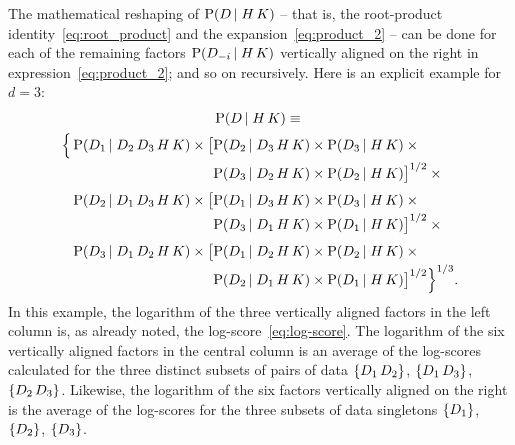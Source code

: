 \documentclass[\ifafour a4paper,12pt,\else a5paper,10pt,\fi%
onecolumn,oneside,article,%
british%
]{memoir}
\theoremstyle{remark}
\theoremstyle{innote}
\DeclarePairedDelimiter\set{\{}{\}}
\newcommand*{\p}{\mathrm{P}}%
\renewcommand*{\|}[1][]{\nonscript\,#1\vert\nonscript\;\mathopen{}}
\newcommand*{\yK}{K}
\begin{document}
The mathematical reshaping of $\p(D \| H \, \yK)$ -- that is, the
root-product identity~\eqref{eq:root_product} and the
expansion~\eqref{eq:product_2} -- can be done for each of the remaining
factors $\p(D_{-i} \| H \, \yK)$ vertically aligned on the right in
expression~\eqref{eq:product_2}; and so on recursively. Here is an explicit
example for $d=3$:
\begin{multline}
  \label{eq:example_further_expansion}
  \p(D \| H \, \yK) \equiv{}\\
  \begin{alignedat}{2}
    \Bigl\{\,&\p(D_{1} \| D_{2} \,D_{3} \, H \, \yK) \times
    \bigl[ &&\p(D_{2} \| D_{3} \, H \, \yK) \times \p( D_{3} \| H \, \yK) \times{}\\[-0.5\jot]
    &&&\p(D_{3} \| D_{2} \, H \, \yK) \times \p( D_{2} \| H \, \yK)
    \bigr]^{1/2}\times{}\\[\jot]
    &\p(D_{2} \| D_{1} \,D_{3} \, H \, \yK) \times
    \bigl[&&\p(D_{1} \| D_{3} \, H \, \yK) \times \p( D_{3} \| H \, \yK) \times{}\\[-0.5\jot]
    &&&\p(D_{3} \| D_{1} \, H \, \yK) \times \p( D_{1} \| H \, \yK)
    \bigr]^{1/2}\times{}\\[\jot]
    &\p(D_{3} \| D_{1} \,D_{2} \, H \, \yK) \times
    \bigl[&&\p(D_{1} \| D_{2} \, H \, \yK) \times \p( D_{2} \| H \, \yK) \times{}\\[-0.5\jot]
    &&&\p(D_{2} \| D_{1} \, H \, \yK) \times \p( D_{1} \| H \, \yK)
    \bigr]^{1/2}\Bigr\}^{1/3}.
  \end{alignedat}
\end{multline}
In this example, the logarithm of the three vertically aligned factors in
the left column is, as already noted, the log-score~\eqref{eq:log-score}.
The logarithm of the six vertically aligned factors in the central column
is an average of the log-scores calculated for the three distinct subsets
of pairs of data $\set{D_{1}\,D_{2}}$, $\set{D_{1}\, D_{3}}$,
$\set{D_{2}\, D_{3}}$. Likewise, the logarithm of the six factors
vertically aligned on the right is the average of the log-scores for the
three subsets of data singletons $\set{D_{1}}$, $\set{D_{2}}$,
$\set{D_{3}}$.
\end{document}
